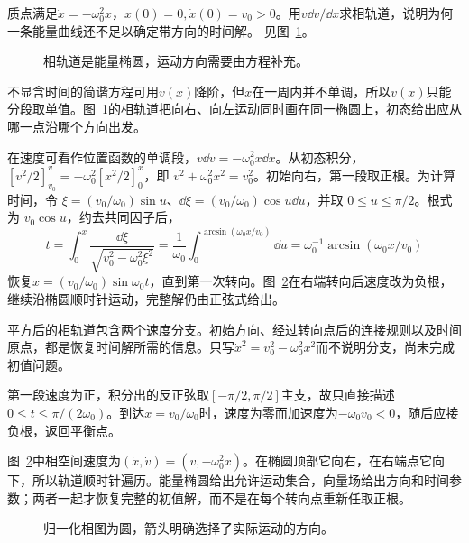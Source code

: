 \begin{exercise}[速度作为位置函数的降阶]\label{ex:c2-h16}
质点满足$\ddot x=-\omega_0^2x$，$x(0)=0,\dot x(0)=v_0>0$。用$v\dd v/\dd x$求相轨道，说明为何一条能量曲线还不足以确定带方向的时间解。 见图~\ref{fig:c2-h16-q}。
\end{exercise}

\begin{figure}[H]\centering
{}
\caption{相轨道是能量椭圆，运动方向需要由方程补充。}\label{fig:c2-h16-q}
\end{figure}
\begin{solution}
不显含时间的简谐方程可用$v(x)$降阶，但$x$在一周内并不单调，所以$v(x)$只能分段取单值。图~\ref{fig:c2-h16-q}的相轨道把向右、向左运动同时画在同一椭圆上，初态给出应从哪一点沿哪个方向出发。


在速度可看作位置函数的单调段，$v\dd v=-\omega_0^2x\dd x$。从初态积分，$[v^2/2]_{v_0}^{v}=-\omega_0^2[x^2/2]_0^x$，即 $v^2+\omega_0^2x^2=v_0^2$。初始向右，第一段取正根。为计算时间，令 $\xi=(v_0/\omega_0)\sin u$、$\dd\xi=(v_0/\omega_0)\cos u\dd u$，并取 $0\le u\le\pi/2$。根式为 $v_0\cos u$，约去共同因子后，
\[t=\int_0^x\frac{\dd\xi}{\sqrt{v_0^2-\omega_0^2\xi^2}}
=\frac1{\omega_0}\int_0^{\arcsin(\omega_0x/v_0)}\dd u
=\omega_0^{-1}\arcsin(\omega_0x/v_0)
\]
恢复$x=(v_0/\omega_0)\sin\omega_0t$，直到第一次转向。图~\ref{fig:c2-h16-s}在右端转向后速度改为负根，继续沿椭圆顺时针运动，完整解仍由正弦式给出。

平方后的相轨道包含两个速度分支。初始方向、经过转向点后的连接规则以及时间原点，都是恢复时间解所需的信息。只写$\dot x^2=v_0^2-\omega_0^2x^2$而不说明分支，尚未完成初值问题。


第一段速度为正，积分出的反正弦取$[-\pi/2,\pi/2]$主支，故只直接描述$0\le t\le\pi/(2\omega_0)$。到达$x=v_0/\omega_0$时，速度为零而加速度为$-\omega_0v_0<0$，随后应接负根，返回平衡点。

图~\ref{fig:c2-h16-s}中相空间速度为$(\dot x,\dot v)=(v,-\omega_0^2x)$。在椭圆顶部它向右，在右端点它向下，所以轨道顺时针遍历。能量椭圆给出允许运动集合，向量场给出方向和时间参数；两者一起才恢复完整的初值解，而不是在每个转向点重新任取正根。

\begin{figure}[H]\centering
{}
\caption{归一化相图为圆，箭头明确选择了实际运动的方向。}\label{fig:c2-h16-s}
\end{figure}
\end{solution}

